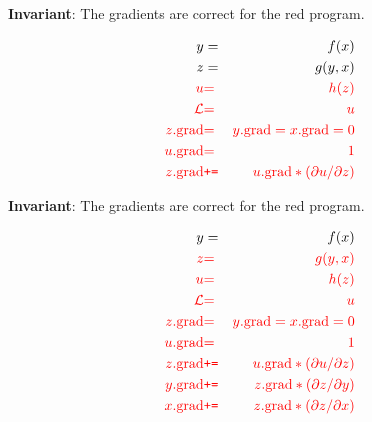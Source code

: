 {\vfill
{\bf Invariant}: The gradients are correct for the red program.

\vspace{-3ex}
\begin{eqnarray*}
  y & = & f(x) \\
  z & = & g(y,x) \\
  {\color{red} u} & {\color{red} =} & {\color{red} h(z)} \\
  {\color{red} {\cal L}} &  {\color{red} =} & {\color{red}  u} \\
  {\color{red} z.\mathrm{grad}} & {\color{red} =} & {\color{red} y.\mathrm{grad} = x.\mathrm{grad} = 0} \\
  {\color{red} u.\mathrm{grad}} & {\color{red} =} & {\color{red} 1} \\
  {\color{red} z.\mathrm{grad}} & {\color{red} \mbox{\tt +=}} & {\color{red} u.\mathrm{grad} * ({\partial u}/{\partial z})}
\end{eqnarray*}

\vfill
{\bf Invariant}: The gradients are correct for the red program.

\vspace{-3ex}
\begin{eqnarray*}
  y & = & f(x) \\
  {\color{red} z} & {\color{red} =} & {\color{red} g(y,x)} \\ 
  {\color{red} u} & {\color{red} =} & {\color{red} h(z)} \\
  {\color{red} {\cal L}} &  {\color{red} =} & {\color{red}  u} \\
  {\color{red} z.\mathrm{grad}} & {\color{red} =} & {\color{red} y.\mathrm{grad} = x.\mathrm{grad} = 0} \\
  {\color{red} u.\mathrm{grad}} & {\color{red} =} & {\color{red} 1} \\
  {\color{red} z.\mathrm{grad}} & {\color{red} \mbox{\tt +=}} & {\color{red} u.\mathrm{grad} * ({\partial u}/{\partial z})} \\
  {\color{red} y.\mathrm{grad}} & {\color{red} \mbox{\tt +=}} & {\color{red} z.\mathrm{grad} * ({\partial z}/{\partial y})} \\
  {\color{red} x.\mathrm{grad}} & {\color{red} \mbox{\tt +=}} & {\color{red} z.\mathrm{grad} * ({\partial z}/{\partial x})}
\end{eqnarray*}


}
